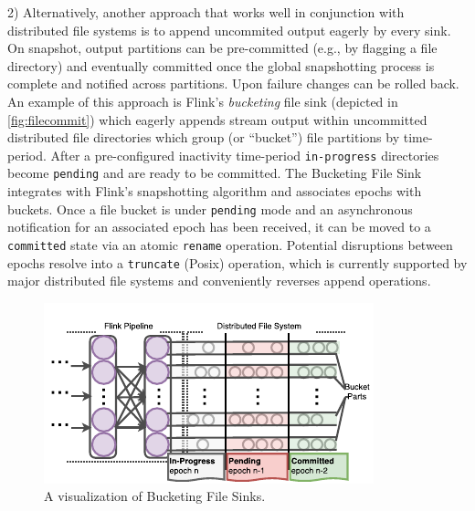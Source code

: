 2) Alternatively, another approach that works well in conjunction with distributed file systems is to append uncommited output eagerly by every sink. On snapshot, output partitions can be pre-committed (e.g., by flagging a file directory) and eventually committed once the global snapshotting process is complete and notified across partitions. Upon failure changes can be rolled back. An example of this approach is Flink's \emph{bucketing} file sink (depicted in \autoref{fig:filecommit}) which eagerly appends stream output within uncommitted distributed file directories which group (or ``bucket'') file partitions by time-period. After a pre-configured inactivity time-period \texttt{in-progress} directories become \texttt{pending} and are ready to be committed. The Bucketing File Sink integrates with Flink's snapshotting algorithm and associates epochs with buckets. Once a file bucket is under \texttt{pending} mode and an asynchronous notification for an associated epoch has been received, it can be moved to a \texttt{committed} state via an atomic \texttt{rename} operation. Potential disruptions between epochs resolve into a \texttt{truncate} (Posix) operation, which is currently supported by major distributed file systems and conveniently reverses append operations.


\begin{figure}[t!]
\centering
\includegraphics[width=\textwidth / 2]{figures/filecommit.pdf}
\caption{A visualization of Bucketing File Sinks.} 
\label{fig:filecommit}
\vspace{-4mm}
\end{figure}




